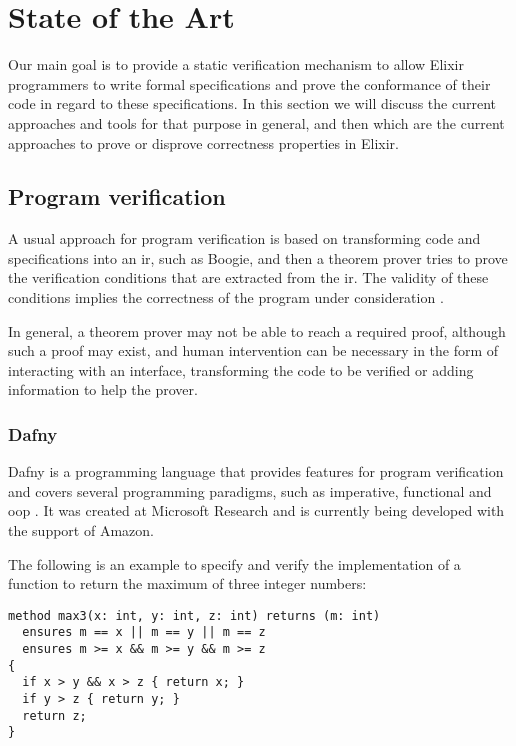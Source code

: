 \chapter{State of the Art}
\label{cap:stateOfTheArt}


Our main goal is to provide a static verification mechanism to allow Elixir
programmers to write formal specifications and prove the conformance of their 
code in regard to these specifications. In this section we will discuss the
current approaches and tools for that purpose in general, and then which are the
current approaches to prove or disprove correctness properties in Elixir.

\section{Program verification}

A usual approach for program verification is based on transforming code and
specifications into an \gls{ir}, such as Boogie, and then a theorem prover tries
to prove the verification conditions that are extracted from the \gls{ir}. The
validity of these conditions implies the correctness of the program under
consideration \citep{Boogie2}.

In general, a theorem prover may not be able to reach a required proof, although
such a proof may exist, and human intervention can be necessary in the form of
interacting with an interface, transforming the code to be verified or adding
information to help the prover.

\subsection{Dafny}

Dafny is a programming language that provides features for program verification
and covers several programming paradigms, such as imperative, functional and
\gls{oop} \citep{DafnyManual}.  It was created at Microsoft Research and is
currently being developed with the support of Amazon.

The following is an example to specify and verify the implementation of a
function to return the maximum of three integer numbers:

\begin{lstlisting}[language=dafny,numbers=none,frame=none]
method max3(x: int, y: int, z: int) returns (m: int)
  ensures m == x || m == y || m == z
  ensures m >= x && m >= y && m >= z
{
  if x > y && x > z { return x; }
  if y > z { return y; }
  return z;
}
\end{lstlisting}

